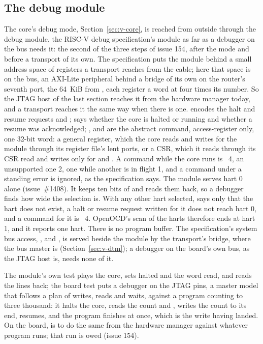 \documentclass[journal,onecolumn,9pt]{IEEEtran}
\begin{document}

\subsection{The debug module}
\label{sec:v-dm}

The core's debug mode, Section~\ref{sec:v-core}, is reached from
outside through the debug module, the RISC-V debug specification's
module as far as a debugger on the bus needs it: the second of the
three steps of issue 154, after the mode and before a transport of
its own. The specification puts the module behind a small address
space of registers a transport reaches from the cable; here that
space is on the bus, an AXI-Lite peripheral behind a bridge of its
own on the router's seventh port, the 64~KiB from ,
each register a word at four times its number. So the JTAG host of
the last section reaches it from the hardware manager today, and a
transport reaches it the same way when there is one. 
encodes the halt and resume requests and ;
 says whether the core is halted or running and
whether a resume was acknowledged; , 
and  are the abstract command, access-register only, one
32-bit word: a general register, which the core reads and writes for
the module through its register file's lent ports, or a CSR, which
it reads through its CSR read and writes only for  and
. A command while the core runs is ~4, an
unsupported one 2, one while another is in flight 1, and a command
under a standing error is ignored, as the specification says. The
module serves hart 0 alone (issue~\#1408). It keeps ten bits of
 and reads them back, so a debugger finds how wide the
selection is. With any other hart selected,  says only
that the hart does not exist, a halt or resume request written for it
does not reach hart 0, and a command for it is ~4.
OpenOCD's scan of the harts therefore ends at hart 1, and it reports
one hart. There is no program buffer. The specification's system bus access,
,  and , is served beside
the module by the transport's bridge, where the bus master is
(Section~\ref{sec:v-dtm}); a debugger on the board's own bus, as the
JTAG host is, needs none of it.

The module's own test plays the core, sets halted and the word read,
and reads the lines back; the board test puts a debugger on the JTAG
pins, a master model that follows a plan of writes, reads and waits,
against a program counting to three thousand: it halts the core, reads
the count and , writes the count to its end, resumes, and the
program finishes at once, which is the write having landed. On the
board,  is to do the same from the hardware
manager against whatever program runs; that run is owed (issue 154).
\end{document}

